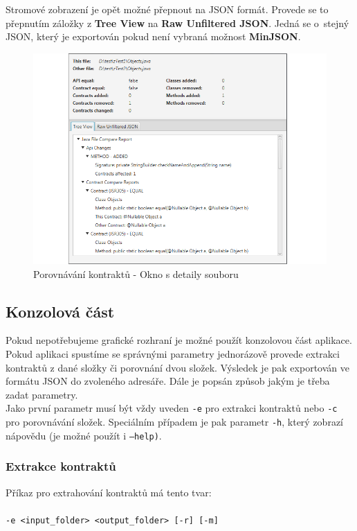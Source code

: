 		Stromové zobrazení je opět možné přepnout na JSON formát. Provede se to přepnutím záložky z \textbf{Tree View} na \textbf{Raw Unfiltered JSON}. Jedná se o~stejný JSON, který je exportován pokud není vybraná možnost \textbf{MinJSON}.
		
			\begin{figure}[!htb]
					\centering
					\includegraphics[width=1\textwidth]{img/guide07.png}
					\caption[guide07]{Porovnávání kontraktů - Okno s detaily souboru}
					\label{guide07}
				\endminipage\hfill
			\end{figure}		
		
	\subsection{Konzolová část}
		Pokud nepotřebujeme grafické rozhraní je možné použít konzolovou část aplikace. Pokud aplikaci spustíme se správnými parametry jednorázově provede extrakci kontraktů z dané složky či porovnání dvou složek. Výsledek je pak exportován ve formátu JSON do zvoleného adresáře. Dále je popsán způsob jakým je třeba zadat parametry.\\
		
		Jako první parametr musí být vždy uveden \texttt{-e} pro extrakci kontraktů nebo \texttt{-c} pro porovnávání složek. Speciálním případem je pak parametr \texttt{-h}, který zobrazí nápovědu (je možné použít i \texttt{---help)}.
		
		\subsubsection{Extrakce kontraktů}
			Příkaz pro extrahování kontraktů má tento tvar:\\\\
			\- \- \- \texttt{-e <input\_folder> <output\_folder> [-r] [-m]}\\
			
